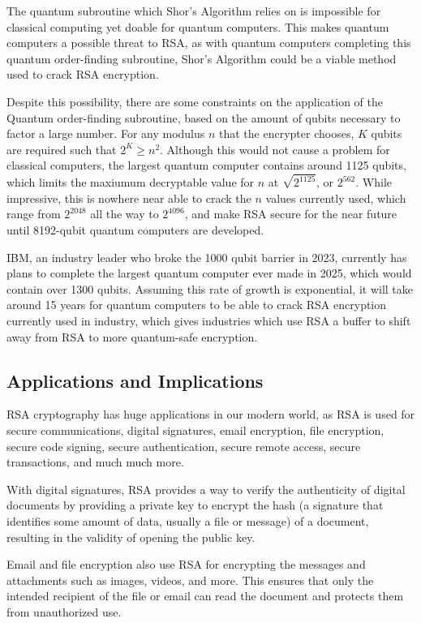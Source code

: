 \documentclass{article}
\begin{document}
The quantum subroutine which Shor's Algorithm relies on is impossible for classical computing yet doable for quantum computers. This makes quantum computers a possible threat to RSA, as with quantum computers completing this quantum order-finding subroutine, Shor's Algorithm could be a viable method used to crack RSA encryption.

Despite this possibility, there are some constraints on the application of the Quantum order-finding subroutine, based on the amount of qubits necessary to factor a large number. For any modulus $n$ that the encrypter chooses, $K$ qubits are required such that $2^K \geq n^2$. Although this would not cause a problem for classical computers, the largest quantum computer  contains around 1125 qubits, which limits the maxiumum decryptable value for $n$ at $\sqrt{2^{1125}}$, or $2^{562}$. While impressive, this is nowhere near able to crack the $n$ values currently used, which range from $2^{2048}$ all the way to $2^{4096}$, and make RSA secure for the near future until 8192-qubit quantum computers are developed. 

IBM, an industry leader who broke the 1000 qubit barrier in 2023, currently has plans to complete the largest quantum computer ever made in 2025, which would contain over 1300 qubits. Assuming this rate of growth is exponential, it will take around 15 years for quantum computers to be able to crack RSA encryption currently used in industry, which gives industries which use RSA a buffer to shift away from RSA to more quantum-safe encryption.


\subsection{Applications and Implications}
RSA cryptography has huge applications in our modern world, as RSA is used for secure communications, digital signatures, email encryption, file encryption, secure code signing, secure authentication, secure remote access, secure transactions, and much much more.

With digital signatures, RSA provides a way to verify the authenticity of digital documents by providing a private key to encrypt the hash (a signature that identifies some amount of data, usually a file or message) of a document, resulting in the validity of opening the public key.

Email and file encryption also use RSA for encrypting the messages and attachments such as images, videos, and more. This ensures that only the intended recipient of the file or email can read the document and protects them from unauthorized use.
\end{document}
